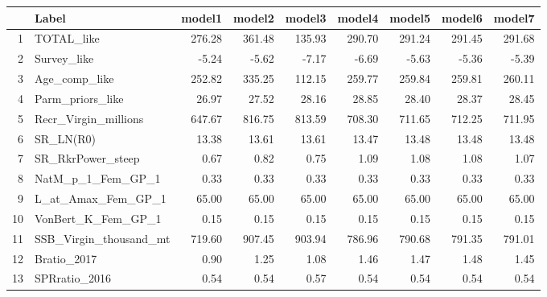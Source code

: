 \begin{table}[ht]
\centering
\begin{tabular}{rlrrrrrrr}
  \hline
 & Label & model1 & model2 & model3 & model4 & model5 & model6 & model7 \\ 
  \hline
1 & TOTAL\_like & 276.28 & 361.48 & 135.93 & 290.70 & 291.24 & 291.45 & 291.68 \\ 
  2 & Survey\_like & -5.24 & -5.62 & -7.17 & -6.69 & -5.63 & -5.36 & -5.39 \\ 
  3 & Age\_comp\_like & 252.82 & 335.25 & 112.15 & 259.77 & 259.84 & 259.81 & 260.11 \\ 
  4 & Parm\_priors\_like & 26.97 & 27.52 & 28.16 & 28.85 & 28.40 & 28.37 & 28.45 \\ 
  5 & Recr\_Virgin\_millions & 647.67 & 816.75 & 813.59 & 708.30 & 711.65 & 712.25 & 711.95 \\ 
  6 & SR\_LN(R0) & 13.38 & 13.61 & 13.61 & 13.47 & 13.48 & 13.48 & 13.48 \\ 
  7 & SR\_RkrPower\_steep & 0.67 & 0.82 & 0.75 & 1.09 & 1.08 & 1.08 & 1.07 \\ 
  8 & NatM\_p\_1\_Fem\_GP\_1 & 0.33 & 0.33 & 0.33 & 0.33 & 0.33 & 0.33 & 0.33 \\ 
  9 & L\_at\_Amax\_Fem\_GP\_1 & 65.00 & 65.00 & 65.00 & 65.00 & 65.00 & 65.00 & 65.00 \\ 
  10 & VonBert\_K\_Fem\_GP\_1 & 0.15 & 0.15 & 0.15 & 0.15 & 0.15 & 0.15 & 0.15 \\ 
  11 & SSB\_Virgin\_thousand\_mt & 719.60 & 907.45 & 903.94 & 786.96 & 790.68 & 791.35 & 791.01 \\ 
  12 & Bratio\_2017 & 0.90 & 1.25 & 1.08 & 1.46 & 1.47 & 1.48 & 1.45 \\ 
  13 & SPRratio\_2016 & 0.54 & 0.54 & 0.57 & 0.54 & 0.54 & 0.54 & 0.54 \\ 
   \hline
\end{tabular}
\end{table}

